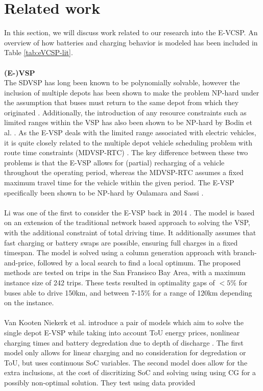 \documentclass[]{article}
\begin{document}
\section{Related work}
In this section, we will discuss work related to our research into the E-VCSP.
An overview of how batteries and charging behavior is modeled has been included in Table \ref{tab:eVCSP-lit}. \\\\
\noindent \textbf{(E-)VSP} \\
The SDVSP has long been known to be polynomially solvable, however the inclusion of
multiple depots has been shown to make the problem NP-hard under the assumption
that buses must return to the same depot from which they originated
\cite{Bunte2009}. Additionally, the introduction of any resource constraints
such as limited ranges within the VSP has also been shown to be NP-hard by
Bodin et al. \cite{Bodin1983}. As the E-VSP deals with the limited range
associated with electric vehicles, it is quite closely related to the multiple
depot vehicle scheduling problem with route time constraints (MDVSP-RTC)
\cite{Haghani2002}. The key difference between these two problems is that the
E-VSP allows for (partial) recharging of a vehicle throughout the operating
period, whereas the MDVSP-RTC assumes a fixed maximum travel time for the
vehicle within the given period. The E-VSP specifically been shown to be
NP-hard by Oulamara and Sassi \cite{Sassi2014}. \\\\
Li was one of the first to consider the E-VSP back in 2014 \cite{Li2014}. The
model is based on an extension of the traditional network based approach to
solving the VSP, with the additional constraint of total driving time. It
additionally assumes that fast charging or battery swaps are possible, ensuring
full charges in a fixed timespan. The model is solved using a column generation
approach with branch-and-price, followed by a local search to find a local
optimum. The proposed methods are tested on trips in the San Fransisco Bay
Area, with a maximum instance size of 242 trips. These tests resulted in
optimality gaps of $<5\%$ for buses able to drive 150km, and between 7-15\%
for a range of 120km depending on the instance. \\\\
Van Kooten Niekerk et al. introduce a pair of models which aim to solve the single depot E-VSP
while taking into account ToU energy prices, nonlinear charging times and
battery degredation due to depth of discharge \cite{vanKootenNiekerk2017}. The first model only allows for linear charging and no consideration for degredation or ToU, but uses continuous SoC variables. The second model does allow for the extra inclusions, at the cost of discritizing SoC and solving using using CG for a possibly non-optimal solution. They test using data provided
\end{document}
